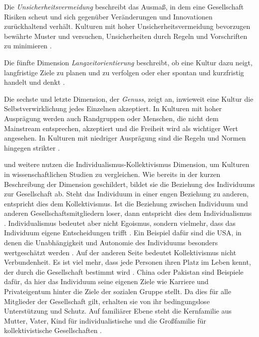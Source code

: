 Die \textit{Unsicherheitsvermeidung} beschreibt das Ausmaß, in dem eine Gesellschaft Risiken scheut und sich gegenüber Veränderungen und Innovationen zurückhaltend verhält. Kulturen mit hoher Unsicherheitsvermeidung bevorzugen bewährte Muster und versuchen, Unsicherheiten durch Regeln und Vorschriften zu minimieren \parencite{HofstedeFocus}.

Die fünfte Dimension \textit{Langzeitorientierung} beschreibt, ob eine Kultur dazu neigt, langfristige Ziele zu planen und zu verfolgen oder eher spontan und kurzfristig handelt und denkt \parencite{HofstedeFocus}.

Die sechste und letzte Dimension, der \textit{Genuss}, zeigt an, inwieweit eine Kultur die Selbstverwirklichung jedes Einzelnen akzeptiert. In Kulturen mit hoher Ausprägung werden auch Randgruppen oder Menschen, die nicht dem Mainstream entsprechen, akzeptiert und die Freiheit wird als wichtiger Wert angesehen. In Kulturen mit niedriger Ausprägung sind die Regeln und Normen hingegen strikter \parencite{HofstedeFocus}.

\textcite{IndiFürStudie} und weitere nutzen die Individualismus-Kollektivismus Dimension, um Kulturen in wissenschaftlichen Studien zu vergleichen. Wie bereits in der kurzen Beschreibung der Dimension geschildert, bildet sie die Beziehung des Individuums zur Gesellschaft ab. Steht das Individuum in einer engen Beziehung zu anderen, entspricht dies dem Kollektivismus. Ist die Beziehung zwischen Individuum und anderen Gesellschaftsmitgliedern loser, dann entspricht dies dem Individualismus \parencite{HofstedeOG}. Individualismus bedeutet aber nicht Egoismus, sondern vielmehr, dass das Individuum eigene Entscheidungen trifft \parencite{Hofstede}. Ein Beispiel dafür sind die USA, in denen die Unabhängigkeit und Autonomie des Individuums besonders wertgeschätzt werden \parencite{Utler2020}. Auf der anderen Seite bedeutet Kollektivismus nicht Verbundenheit. Es ist viel mehr, dass jede Personen ihren Platz im Leben kennt, der durch die Gesellschaft bestimmt wird \parencite{Hofstede}. China oder Pakistan sind Beispiele dafür, da hier das Individuum seine eigenen Ziele wie Karriere und Privateigentum hinter die Ziele der sozialen Gruppe stellt. Da dies für alle Mitglieder der Gesellschaft gilt, erhalten sie von ihr bedingungslose Unterstützung und Schutz. Auf familiärer Ebene steht die Kernfamilie aus Mutter, Vater, Kind für individualistische und die Großfamilie für kollektivistische Gesellschaften \parencite{Utler2020}. 

